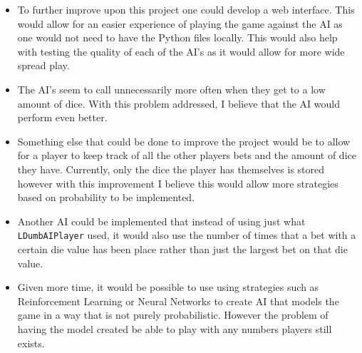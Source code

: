 \begin{itemize}
    \item To further improve upon this project one could develop a web interface. This would allow for an easier experience of playing the game against the AI as one would not need to have the Python files locally. This would also help with testing the quality of each of the AI's as it would allow for more wide spread play.
    \item The AI's seem to call unnecessarily more often when they get to a low amount of dice. With this problem addressed, I believe that the AI would perform even better.
    \item Something else that could be done to improve the project would be to allow for a player to keep track of all the other players bets and the amount of dice they have. Currently, only the dice the player has themselves is stored however with this improvement I believe this would allow more strategies based on probability to be implemented.
    \item Another AI could be implemented that instead of using just what \texttt{LDumbAIPlayer} used, it would also use the number of times that a bet with a certain die value has been place rather than just the largest bet on that die value.
    \item Given more time, it would be possible to use using strategies such as Reinforcement Learning or Neural Networks to create AI that models the game in a way that is not purely probabilistic. However the problem of having the model created be able to play with any numbers players still exists.
\end{itemize}
